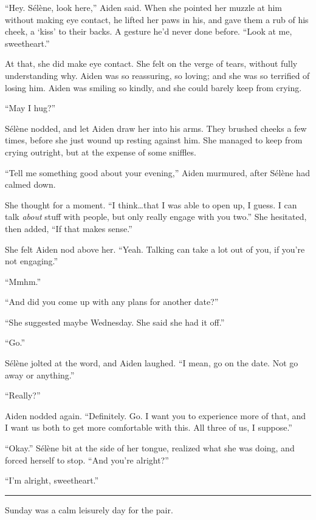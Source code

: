 ``Hey. Sélène, look here,'' Aiden said. When she pointed her muzzle at him without making eye contact, he lifted her paws in his, and gave them a rub of his cheek, a `kiss' to their backs. A gesture he'd never done before. ``Look at me, sweetheart.''

At that, she did make eye contact. She felt on the verge of tears, without fully understanding why. Aiden was so reassuring, so loving; and she was so terrified of losing him. Aiden was smiling so kindly, and she could barely keep from crying.

``May I hug?''

Sélène nodded, and let Aiden draw her into his arms. They brushed cheeks a few times, before she just wound up resting against him. She managed to keep from crying outright, but at the expense of some sniffles.

``Tell me something good about your evening,'' Aiden murmured, after Sélène had calmed down.

She thought for a moment. ``I think\ldots{}that I was able to open up, I guess. I can talk \emph{about} stuff with people, but only really engage with you two.'' She hesitated, then added, ``If that makes sense.''

She felt Aiden nod above her. ``Yeah. Talking can take a lot out of you, if you're not engaging.''

``Mmhm.''

``And did you come up with any plans for another date?''

``She suggested maybe Wednesday. She said she had it off.''

``Go.''

Sélène jolted at the word, and Aiden laughed. ``I mean, go on the date. Not go away or anything.''

``Really?''

Aiden nodded again. ``Definitely. Go. I want you to experience more of that, and I want us both to get more comfortable with this. All three of us, I suppose.''

``Okay.'' Sélène bit at the side of her tongue, realized what she was doing, and forced herself to stop. ``And you're alright?''

``I'm alright, sweetheart.''

\begin{center}\rule{0.5\linewidth}{\linethickness}\end{center}

Sunday was a calm leisurely day for the pair.

